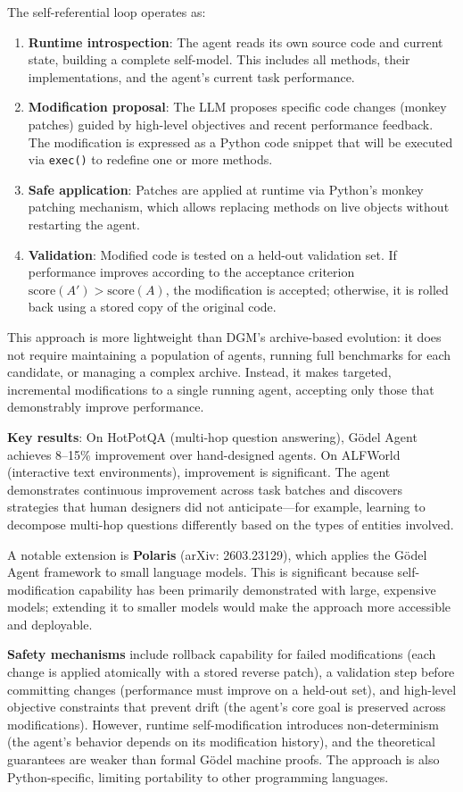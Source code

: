 The self-referential loop operates as:
\begin{enumerate}
\item \textbf{Runtime introspection}: The agent reads its own source code and current state, building a complete self-model. This includes all methods, their implementations, and the agent's current task performance.
\item \textbf{Modification proposal}: The LLM proposes specific code changes (monkey patches) guided by high-level objectives and recent performance feedback. The modification is expressed as a Python code snippet that will be executed via \texttt{exec()} to redefine one or more methods.
\item \textbf{Safe application}: Patches are applied at runtime via Python's monkey patching mechanism, which allows replacing methods on live objects without restarting the agent.
\item \textbf{Validation}: Modified code is tested on a held-out validation set. If performance improves according to the acceptance criterion $\text{score}(A') > \text{score}(A)$, the modification is accepted; otherwise, it is rolled back using a stored copy of the original code.
\end{enumerate}

This approach is more lightweight than DGM's archive-based evolution: it does not require maintaining a population of agents, running full benchmarks for each candidate, or managing a complex archive. Instead, it makes targeted, incremental modifications to a single running agent, accepting only those that demonstrably improve performance.

\textbf{Key results}: On HotPotQA (multi-hop question answering), G\"odel Agent achieves 8--15\% improvement over hand-designed agents. On ALFWorld (interactive text environments), improvement is significant. The agent demonstrates continuous improvement across task batches and discovers strategies that human designers did not anticipate---for example, learning to decompose multi-hop questions differently based on the types of entities involved.

A notable extension is \textbf{Polaris} (arXiv: 2603.23129), which applies the G\"odel Agent framework to small language models. This is significant because self-modification capability has been primarily demonstrated with large, expensive models; extending it to smaller models would make the approach more accessible and deployable.

\textbf{Safety mechanisms} include rollback capability for failed modifications (each change is applied atomically with a stored reverse patch), a validation step before committing changes (performance must improve on a held-out set), and high-level objective constraints that prevent drift (the agent's core goal is preserved across modifications). However, runtime self-modification introduces non-determinism (the agent's behavior depends on its modification history), and the theoretical guarantees are weaker than formal G\"odel machine proofs. The approach is also Python-specific, limiting portability to other programming languages.

